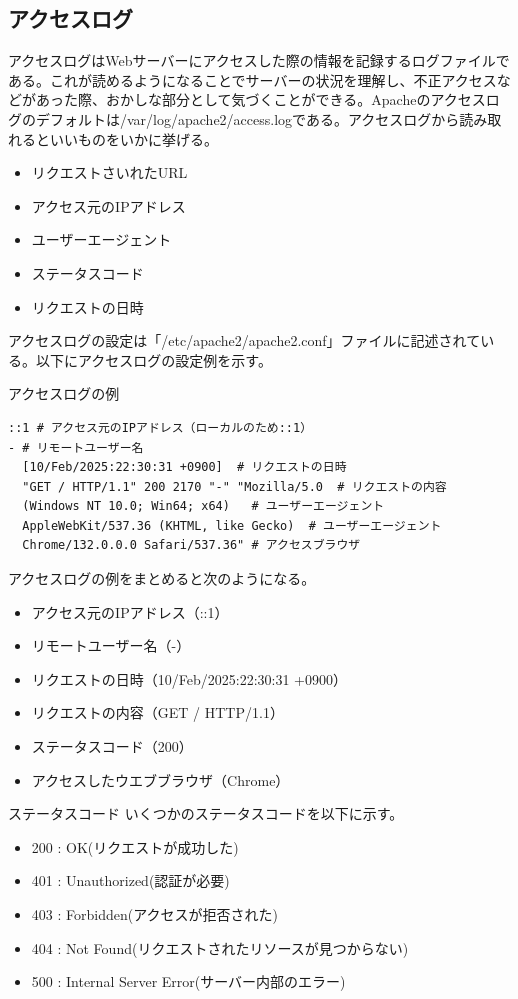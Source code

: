 \documentclass[a4paper, 11pt, dvipdfmx]{jsarticle}
\begin{document}
\subsection{アクセスログ}
アクセスログはWebサーバーにアクセスした際の情報を記録するログファイルである。これが読めるようになることでサーバーの状況を理解し、不正アクセスなどがあった際、おかしな部分として気づくことができる。Apacheのアクセスログのデフォルトは/var/log/apache2/access.logである。アクセスログから読み取れるといいものをいかに挙げる。
\begin{itemize}
  \item リクエストさいれたURL
  \item アクセス元のIPアドレス
  \item ユーザーエージェント
  \item ステータスコード
  \item リクエストの日時
\end{itemize}
アクセスログの設定は「/etc/apache2/apache2.conf」ファイルに記述されている。以下にアクセスログの設定例を示す。
\begin{commandbox}{アクセスログの例}
  \begin{verbatim}
::1 # アクセス元のIPアドレス（ローカルのため::1）
- # リモートユーザー名
  [10/Feb/2025:22:30:31 +0900]  # リクエストの日時
  "GET / HTTP/1.1" 200 2170 "-" "Mozilla/5.0  # リクエストの内容
  (Windows NT 10.0; Win64; x64)   # ユーザーエージェント
  AppleWebKit/537.36 (KHTML, like Gecko)  # ユーザーエージェント
  Chrome/132.0.0.0 Safari/537.36" # アクセスブラウザ\end{verbatim}
\end{commandbox}
アクセスログの例をまとめると次のようになる。
\begin{itemize}
  \item アクセス元のIPアドレス（::1）
  \item リモートユーザー名（-）
  \item リクエストの日時（10/Feb/2025:22:30:31 +0900）
  \item リクエストの内容（GET / HTTP/1.1）
  \item ステータスコード（200）
  \item アクセスしたウエブブラウザ（Chrome）
\end{itemize}
\begin{johobox}{ステータスコード}
  いくつかのステータスコードを以下に示す。
  \begin{itemize}
    \item 200 : OK(リクエストが成功した)
    \item 401 : Unauthorized(認証が必要)
    \item 403 : Forbidden(アクセスが拒否された)
    \item 404 : Not Found(リクエストされたリソースが見つからない)
    \item 500 : Internal Server Error(サーバー内部のエラー)
  \end{itemize}
\end{johobox}
\end{document}
